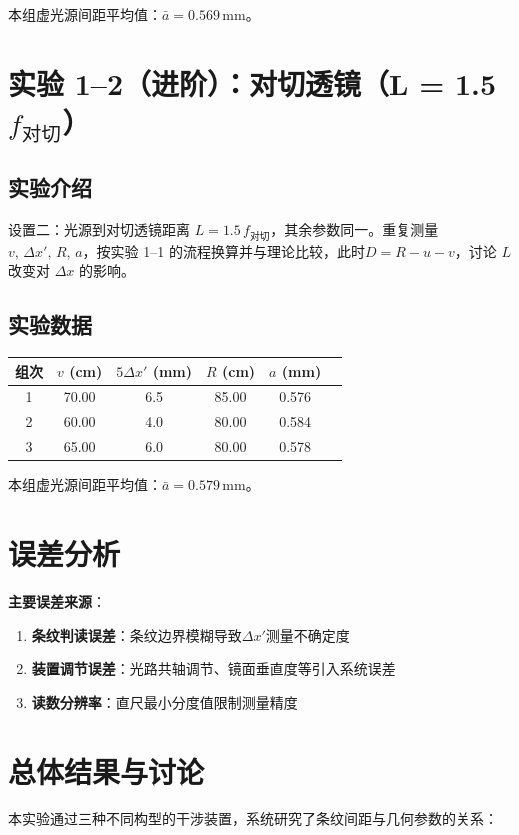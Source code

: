 \documentclass[12pt,a4paper]{article}
\begin{document}
\noindent 本组虚光源间距平均值：$\bar a = 0.569 \,\mathrm{mm}$。


\section{实验 1--2（进阶）：对切透镜（L = 1.5\,$f_{\text{对切}}$）}
\subsection*{实验介绍}
设置二：光源到对切透镜距离 $L=1.5\,f_{\text{对切}}$，其余参数同一。重复测量 $v,\,\Delta x',\,R,\,a$，按实验 1--1 的流程换算并与理论比较，此时$D = R - u - v$，讨论 $L$ 改变对 $\Delta x$ 的影响。

\subsection*{实验数据}
\begin{center}
\begin{tabular}{cccccc}
\toprule
组次 & $v$ (cm) & $5\Delta x'$ (mm) & $R$ (cm) & $a$ (mm)  \\
\midrule
1 & 70.00 & 6.5 & 85.00 & 0.576 \\
2 & 60.00 & 4.0 & 80.00 & 0.584  \\
3 & 65.00 & 6.0 & 80.00 & 0.578  \\
\bottomrule
\end{tabular}
\end{center}

\noindent 本组虚光源间距平均值：$\bar a = 0.579 \,\mathrm{mm}$。

\section{误差分析}
\textbf{主要误差来源}：
\begin{enumerate}
    \item \textbf{条纹判读误差}：条纹边界模糊导致$\Delta x'$测量不确定度
    \item \textbf{装置调节误差}：光路共轴调节、镜面垂直度等引入系统误差
    \item \textbf{读数分辨率}：直尺最小分度值限制测量精度
\end{enumerate}


\section{总体结果与讨论}
本实验通过三种不同构型的干涉装置，系统研究了条纹间距与几何参数的关系：
\end{document}
